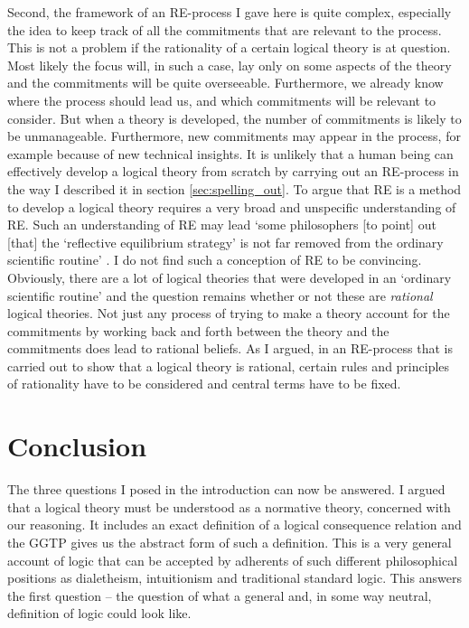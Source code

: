 \documentclass{article}
\begin{document}
Second, the framework of an RE-process I gave here is quite complex, especially the idea to keep track of all the commitments that are relevant to the process. This is not a problem if the rationality of a certain logical theory is at question. Most likely the focus will, in such a case, lay only on some aspects of the theory and the commitments will be quite overseeable. Furthermore, we already know where the process should lead us, and which commitments will be relevant to consider. But when a theory is developed, the number of commitments is likely to be unmanageable. Furthermore, new commitments may appear in the process, for example because of new technical insights. It is unlikely that a human being can effectively develop a logical theory from scratch by carrying out an RE-process in the way I described it in section \ref{sec:spelling_out}. To argue that RE is a method to develop a logical theory requires a very broad and unspecific understanding of RE. Such an understanding of RE may lead `some philosophers [to point] out [that] the ‘reflective equilibrium strategy’ is not far removed from the ordinary scientific routine' \cite{peregrinsvoboda}. I do not find such a conception of RE to be convincing. Obviously, there are a lot of logical theories that were developed in an `ordinary scientific routine' and the question remains whether or not these are \textit{rational} logical theories. Not just any process of trying to make a theory account for the commitments by working back and forth between the theory and the commitments does lead to rational beliefs. As I argued, in an RE-process that is carried out to show that a logical theory is rational, certain rules and principles of rationality have to be considered and central terms have to be fixed.

\section{Conclusion}
The three questions I posed in the introduction can now be answered. I argued that a logical theory must be understood as a normative theory, concerned with our reasoning. It includes an exact definition of a logical consequence relation and the GGTP gives us the abstract form of such a definition. This is a very general account of logic that can be accepted by adherents of such different philosophical positions as dialetheism, intuitionism and traditional standard logic. This answers the first question -- the question of what a general and, in some way neutral, definition of logic could look like.
\end{document}

